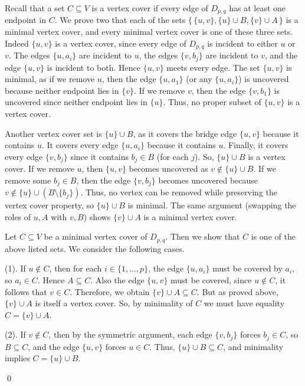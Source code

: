 \documentclass[12pt]{article}
\renewenvironment{proof}{{\noindent\bfseries Proof.}}{\qed}
\theoremstyle{plain}
\theoremstyle{definition}
\begin{document}
		\begin{proof}
			Recall that a set \(C\subseteq V\) is a vertex cover if every edge of \(D_{p,q}\) has at least one endpoint in \(C\).
			We prove two that  each of the  sets $\bigl\{\,\{u,v\}, \{u\}\cup B, \{v\}\cup A\,\bigr\}$ is a minimal vertex cover, and  every minimal vertex cover is one of these three sets.  Indeed \(\{u,v\}\) is a vertex cover, since every edge of \(D_{p,q}\) is incident to either \(u\) or \(v\). The edges \(\{u,a_i\}\) are incident to \(u\), the edges \(\{v,b_j\}\) are incident to \(v\), and the edge \(\{u,v\}\) is incident to both. Hence \(\{u,v\}\) meets every edge.  The set \(\{u,v\}\) is minimal, as if we remove \(u\), then the edge \(\{u,a_1\}\) (or any \(\{u,a_i\}\)) is uncovered because neither endpoint lies in \(\{v\}\). If we remove \(v\), then the edge \(\{v,b_1\}\) is uncovered since neither endpoint lies in \(\{u\}\). Thus, no proper subset of \(\{u,v\}\) is a vertex cover.
			
			Another vertex cover set is \(\{u\}\cup B\), as it covers the bridge edge \(\{u,v\}\) because it contains \(u\).
			It covers every edge \(\{u,a_i\}\) because it contains \(u\). 	Finally, it covers every edge \(\{v,b_j\}\) since it contains \(b_j\in B\) (for each \(j\)).	So, \(\{u\}\cup B\) is a vertex cover. 
			If we remove \(u\), then \(\{u,v\}\) becomes uncovered as \(v\notin \{u\}\cup B\). 	If we remove some \(b_j\in B\), then the edge \(\{v,b_j\}\) becomes uncovered because \(v\notin \{u\}\cup (B\setminus\{b_j\})\). 	Thus, no vertex can be removed while preserving the vertex cover property, so \(\{u\}\cup B\) is minimal. 	The same argument (swapping the roles of \(u,A\) with \(v,B\)) shows \(\{v\}\cup A\) is a minimal vertex cover.
			
			 Let \(C\subseteq V\) be a minimal vertex cover of \(D_{p,q}\). Then we show that $C$ is one of the above listed sets. We consider the following cases.
			 
			\smallskip\noindent
			(1). If \(u\notin C\), then for each \(i\in\{1,\dots,p\}\), the edge \(\{u,a_i\}\) must be covered by \(a_i\), so \(a_i\in C\).
			Hence \(A\subseteq C\).
			Also the edge \(\{u,v\}\) must be covered, since \(u\notin C\), it follows that \(v\in C\).
			Therefore, we obtain $\{v\}\cup A  \subseteq C.$ 	But as proved above, \(\{v\}\cup A\) is itself a vertex cover. So, by minimality of \(C\) we must have equality  $C=\{v\}\cup A.$ 
			
			\smallskip\noindent
			(2). If \(v\notin C\), then by the symmetric argument, each edge \(\{v,b_j\}\) forces \(b_j\in C\), so \(B\subseteq C\),
			and the edge \(\{u,v\}\) forces \(u\in C\). Thus, \(\{u\}\cup B\subseteq C\), and minimality implies \(C=\{u\}\cup B\).
			

\end{proof}
\end{document}
